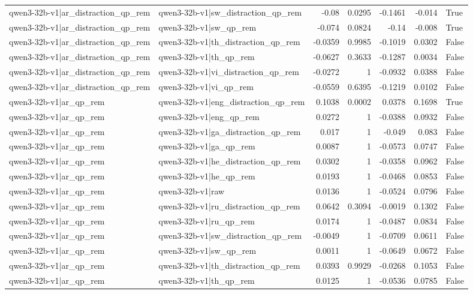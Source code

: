 \begin{table}
\begin{tabular}{l l r r r r l}
qwen3-32b-v1|ar_distraction_qp_rem & qwen3-32b-v1|sw_distraction_qp_rem & -0.08 & 0.0295 & -0.1461 & -0.014 & True \\
qwen3-32b-v1|ar_distraction_qp_rem & qwen3-32b-v1|sw_qp_rem & -0.074 & 0.0824 & -0.14 & -0.008 & True \\
qwen3-32b-v1|ar_distraction_qp_rem & qwen3-32b-v1|th_distraction_qp_rem & -0.0359 & 0.9985 & -0.1019 & 0.0302 & False \\
qwen3-32b-v1|ar_distraction_qp_rem & qwen3-32b-v1|th_qp_rem & -0.0627 & 0.3633 & -0.1287 & 0.0034 & False \\
qwen3-32b-v1|ar_distraction_qp_rem & qwen3-32b-v1|vi_distraction_qp_rem & -0.0272 & 1 & -0.0932 & 0.0388 & False \\
qwen3-32b-v1|ar_distraction_qp_rem & qwen3-32b-v1|vi_qp_rem & -0.0559 & 0.6395 & -0.1219 & 0.0102 & False \\
qwen3-32b-v1|ar_qp_rem & qwen3-32b-v1|eng_distraction_qp_rem & 0.1038 & 0.0002 & 0.0378 & 0.1698 & True \\
qwen3-32b-v1|ar_qp_rem & qwen3-32b-v1|eng_qp_rem & 0.0272 & 1 & -0.0388 & 0.0932 & False \\
qwen3-32b-v1|ar_qp_rem & qwen3-32b-v1|ga_distraction_qp_rem & 0.017 & 1 & -0.049 & 0.083 & False \\
qwen3-32b-v1|ar_qp_rem & qwen3-32b-v1|ga_qp_rem & 0.0087 & 1 & -0.0573 & 0.0747 & False \\
qwen3-32b-v1|ar_qp_rem & qwen3-32b-v1|he_distraction_qp_rem & 0.0302 & 1 & -0.0358 & 0.0962 & False \\
qwen3-32b-v1|ar_qp_rem & qwen3-32b-v1|he_qp_rem & 0.0193 & 1 & -0.0468 & 0.0853 & False \\
qwen3-32b-v1|ar_qp_rem & qwen3-32b-v1|raw & 0.0136 & 1 & -0.0524 & 0.0796 & False \\
qwen3-32b-v1|ar_qp_rem & qwen3-32b-v1|ru_distraction_qp_rem & 0.0642 & 0.3094 & -0.0019 & 0.1302 & False \\
qwen3-32b-v1|ar_qp_rem & qwen3-32b-v1|ru_qp_rem & 0.0174 & 1 & -0.0487 & 0.0834 & False \\
qwen3-32b-v1|ar_qp_rem & qwen3-32b-v1|sw_distraction_qp_rem & -0.0049 & 1 & -0.0709 & 0.0611 & False \\
qwen3-32b-v1|ar_qp_rem & qwen3-32b-v1|sw_qp_rem & 0.0011 & 1 & -0.0649 & 0.0672 & False \\
qwen3-32b-v1|ar_qp_rem & qwen3-32b-v1|th_distraction_qp_rem & 0.0393 & 0.9929 & -0.0268 & 0.1053 & False \\
qwen3-32b-v1|ar_qp_rem & qwen3-32b-v1|th_qp_rem & 0.0125 & 1 & -0.0536 & 0.0785 & False \\

\end{tabular}
\end{table}
